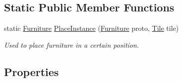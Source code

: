 \subsection*{Static Public Member Functions}
\begin{DoxyCompactItemize}
\item 
static \hyperlink{class_furniture}{Furniture} \hyperlink{class_furniture_acc8b4bbcae6465985d9a4904cc6cc94e}{Place\+Instance} (\hyperlink{class_furniture}{Furniture} proto, \hyperlink{class_tile}{Tile} tile)
\begin{DoxyCompactList}\small\item\em Used to place furniture in a certain position. \end{DoxyCompactList}\end{DoxyCompactItemize}
\subsection*{Properties}
